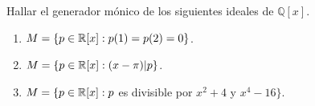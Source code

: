 \item Hallar el generador mónico de los siguientes ideales de $\mathbb{Q}[x]$.
    \begin{enumerate}
        \item $M=\{p\in\mathbb{R}[x]:p(1)=p(2)=0\}$.
            \begin{mdframed}[style=s]
                
            \end{mdframed}
        \item $M=\{p\in\mathbb{R}[x]:(x-\pi)|p\}$.
            \begin{mdframed}[style=s]
                
            \end{mdframed}
        \item $M=\{p\in\mathbb{R}[x]: p$ es divisible por $x^2+4$ y $x^4-16\}$.
            \begin{mdframed}[style=s]
                
            \end{mdframed}
    \end{enumerate}